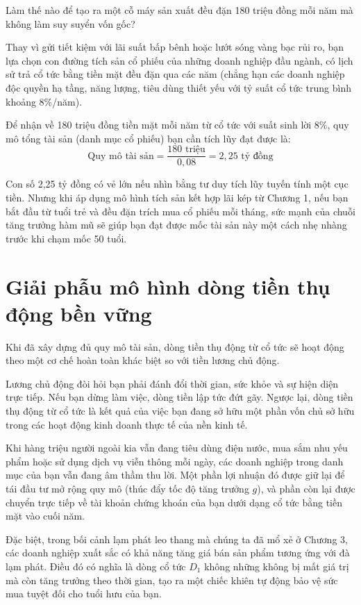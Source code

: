 \documentclass[14pt, a4paper, oneside]{extreport}
\begin{document}
Làm thế nào để tạo ra một cỗ máy sản xuất đều đặn 180 triệu đồng mỗi năm mà không làm suy suyển vốn gốc?

Thay vì gửi tiết kiệm với lãi suất bấp bênh hoặc lướt sóng vàng bạc rủi ro, bạn lựa chọn con đường tích sản cổ phiếu của những doanh nghiệp đầu ngành, có lịch sử trả cổ tức bằng tiền mặt đều đặn qua các năm (chẳng hạn các doanh nghiệp độc quyền hạ tầng, năng lượng, tiêu dùng thiết yếu với tỷ suất cổ tức trung bình khoảng 8\%/năm).

Để nhận về 180 triệu đồng tiền mặt mỗi năm từ cổ tức với suất sinh lời 8\%, quy mô tổng tài sản (danh mục cổ phiếu) bạn cần tích lũy đạt được là:
\begin{equation}
    \text{Quy mô tài sản} = \frac{180 \text{ triệu}}{0,08} = 2,25 \text{ tỷ đồng}
\end{equation}

Con số 2,25 tỷ đồng có vẻ lớn nếu nhìn bằng tư duy tích lũy tuyến tính một cục tiền. Nhưng khi áp dụng mô hình tích sản kết hợp lãi kép từ Chương 1, nếu bạn bắt đầu từ tuổi trẻ và đều đặn trích mua cổ phiếu mỗi tháng, sức mạnh của chuỗi tăng trưởng hàm mũ sẽ giúp bạn đạt được mốc tài sản này một cách nhẹ nhàng trước khi chạm mốc 50 tuổi.

\section{Giải phẫu mô hình dòng tiền thụ động bền vững}

Khi đã xây dựng đủ quy mô tài sản, dòng tiền thụ động từ cổ tức sẽ hoạt động theo một cơ chế hoàn toàn khác biệt so với tiền lương chủ động. 

Lương chủ động đòi hỏi bạn phải đánh đổi thời gian, sức khỏe và sự hiện diện trực tiếp. Nếu bạn dừng làm việc, dòng tiền lập tức đứt gãy. Ngược lại, dòng tiền thụ động từ cổ tức là kết quả của việc bạn đang sở hữu một phần vốn chủ sở hữu trong các hoạt động kinh doanh thực tế của nền kinh tế. 

Khi hàng triệu người ngoài kia vẫn đang tiêu dùng điện nước, mua sắm nhu yếu phẩm hoặc sử dụng dịch vụ viễn thông mỗi ngày, các doanh nghiệp trong danh mục của bạn vẫn đang âm thầm thu lời. Một phần lợi nhuận đó được giữ lại để tái đầu tư mở rộng quy mô (thúc đẩy tốc độ tăng trưởng $g$), và phần còn lại được chuyển trực tiếp về tài khoản chứng khoán của bạn dưới dạng cổ tức bằng tiền mặt vào cuối năm.

Đặc biệt, trong bối cảnh lạm phát leo thang mà chúng ta đã mổ xẻ ở Chương 3, các doanh nghiệp xuất sắc có khả năng tăng giá bán sản phẩm tương ứng với đà lạm phát. Điều đó có nghĩa là dòng cổ tức $D_1$ không những không bị mất giá trị mà còn tăng trưởng theo thời gian, tạo ra một chiếc khiên tự động bảo vệ sức mua tuyệt đối cho tuổi hưu của bạn.
\end{document}
